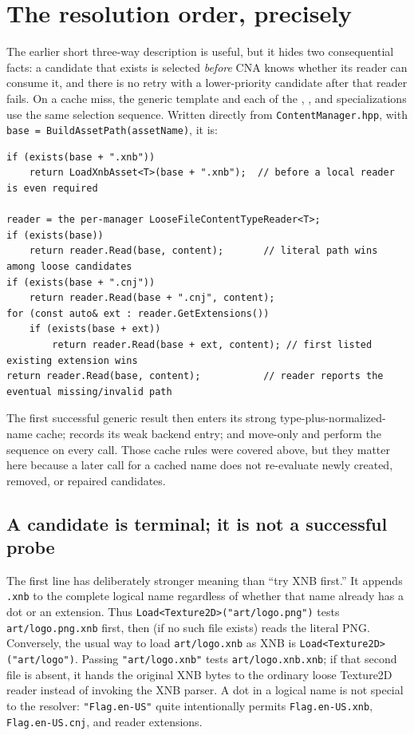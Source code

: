 \section{The resolution order, precisely}

The earlier short three-way description is useful, but it hides two consequential facts: a
candidate that exists is selected \emph{before} CNA knows whether its reader can consume it, and
there is no retry with a lower-priority candidate after that reader fails. On a cache miss, the
generic template and each of the , , and
 specializations use the same selection sequence. Written directly from
\texttt{ContentManager.hpp}, with \texttt{base = BuildAssetPath(assetName)}, it is:

\begin{lstlisting}
if (exists(base + ".xnb"))
    return LoadXnbAsset<T>(base + ".xnb");  // before a local reader is even required

reader = the per-manager LooseFileContentTypeReader<T>;
if (exists(base))
    return reader.Read(base, content);       // literal path wins among loose candidates
if (exists(base + ".cnj"))
    return reader.Read(base + ".cnj", content);
for (const auto& ext : reader.GetExtensions())
    if (exists(base + ext))
        return reader.Read(base + ext, content); // first listed existing extension wins
return reader.Read(base, content);           // reader reports the eventual missing/invalid path
\end{lstlisting}

The first successful generic result then enters its strong type-plus-normalized-name cache;
 records its weak backend entry; and move-only  and
 perform the sequence on every call. Those cache rules were covered above,
but they matter here because a later call for a cached name does not re-evaluate newly created,
removed, or repaired candidates.

\subsection{A candidate is terminal; it is not a successful probe}

The first line has deliberately stronger meaning than ``try XNB first.'' It appends
\texttt{.xnb} to the complete logical name regardless of whether that name already has a dot or
an extension. Thus \texttt{Load<Texture2D>("art/logo.png")} tests
\texttt{art/logo.png.xnb} first, then (if no such file exists) reads the literal PNG. Conversely,
the usual way to load \texttt{art/logo.xnb} as XNB is
\texttt{Load<Texture2D>("art/logo")}. Passing \texttt{"art/logo.xnb"} tests
\texttt{art/logo.xnb.xnb}; if that second file is absent, it hands the original XNB bytes to the
ordinary loose Texture2D reader instead of invoking the XNB parser. A dot in a logical name is
not special to the resolver: \texttt{"Flag.en-US"} quite intentionally permits
\texttt{Flag.en-US.xnb}, \texttt{Flag.en-US.cnj}, and reader extensions.

